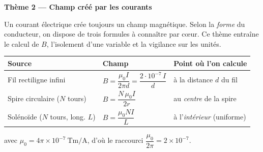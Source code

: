 \documentclass[11pt,a4paper]{article}
\newcommand{\vv}[1]{\vec{#1}}\newcommand{\ds}{\displaystyle}
\begin{document}
\begin{center}
{\Large\bfseries\color{primarydark} Thème 2 — Champ créé par les courants}
\end{center}

\noindent Un courant électrique crée toujours un champ magnétique. Selon la \emph{forme} du
conducteur, on dispose de trois formules à connaître par cœur. Ce thème entraîne le calcul de $B$,
l'isolement d'une variable et la vigilance sur les unités.

\begin{cle}
\renewcommand{\arraystretch}{1.6}
\begin{center}
\begin{tabular}{@{}>{\raggedright\arraybackslash}p{4.1cm} >{\centering\arraybackslash}p{4.6cm} >{\raggedright\arraybackslash}p{5.0cm}@{}}
\textbf{Source} & \textbf{Champ} & \textbf{Point où l'on calcule} \\ \hline
Fil rectiligne infini & $B=\dfrac{\mu_0 I}{2\pi d}=\dfrac{2\cdot10^{-7}\,I}{d}$ & à la distance $d$ du fil \\
Spire circulaire ($N$ tours) & $B=\dfrac{N\,\mu_0 I}{2r}$ & au \emph{centre} de la spire \\
Solénoïde ($N$ tours, long. $L$) & $B=\dfrac{\mu_0 N I}{L}$ & à l'\emph{intérieur} (uniforme) \\
\end{tabular}
\end{center}
avec $\mu_0=4\pi\times10^{-7}\ \si{\tesla\metre\per\ampere}$, d'où le raccourci
$\dfrac{\mu_0}{2\pi}=2\times10^{-7}$.
\end{cle}

\begin{center}
\end{center}
\end{document}
